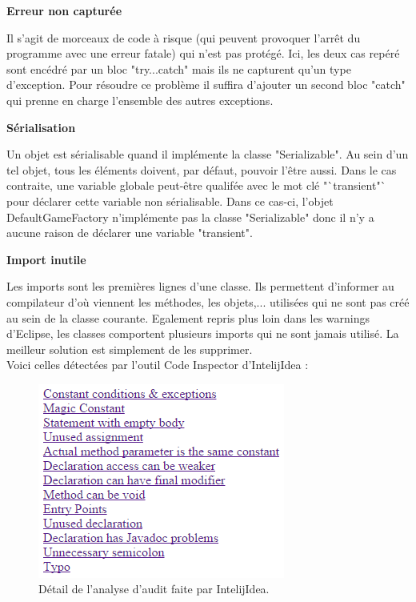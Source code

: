 \documentclass[12pt,a4paper,final]{article}
\newcommand{\smalltitle}[1]{\bigskip\large\textbf{#1}\par\normalsize\medskip}
\begin{document}
\smalltitle{Erreur non capturée}
Il s'agit de morceaux de code à risque (qui peuvent provoquer l'arrêt du programme avec une erreur fatale) qui n'est pas protégé.
Ici, les deux cas repéré sont encédré par un bloc "try...catch" mais ils ne capturent qu'un type d'exception. Pour résoudre ce problème il suffira d'ajouter un second bloc "catch" qui prenne en charge l'ensemble des autres exceptions.

\smalltitle{Sérialisation}
Un objet est sérialisable quand il implémente la classe "Serializable". Au sein d'un tel objet, tous les éléments doivent, par défaut, pouvoir l'être aussi. Dans le cas contraite, une variable globale peut-être qualifée avec le mot clé "`transient"` pour déclarer cette variable non sérialisable.
Dans ce cas-ci, l'objet DefaultGameFactory n'implémente pas la classe "Serializable" donc il n'y a aucune raison de déclarer une variable "transient".

\smalltitle{Import inutile}
Les imports sont les premières lignes d'une classe. Ils permettent d'informer au compilateur d'où viennent les méthodes, les objets,... utilisées qui ne sont pas créé au sein de la classe courante.
Egalement repris plus loin dans les warnings d'Eclipse, les classes comportent plusieurs imports qui ne sont jamais utilisé.
La meilleur solution est simplement de les supprimer.\\
Voici celles détectées par l'outil Code Inspector d'IntelijIdea : 
\begin{figure}[!h]
	\centering
	\includegraphics{AuditII.png}
	\caption{\label{Audit}Détail de l'analyse d'audit faite par IntelijIdea.}
\end{figure}
\end{document}
